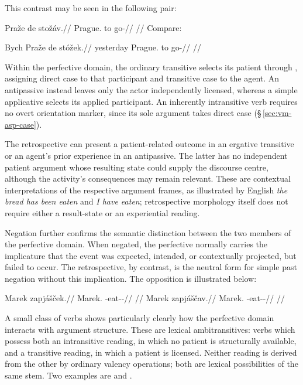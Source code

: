 This contrast may be seen in the following pair:

\pex
\a
\begingl
\gla Praže de stožáv.//
\glb Prague.\Ind{} to go-\Ret{}//
\glft {}//
\endgl
\a Compare:\par
\begingl
\gla Bych Praže de stóžek.//
\glb yesterday Prague.\Ind{} to go-\Pf{}//
\glft {} //
\endgl
\xe

Within the perfective domain, the ordinary transitive selects its patient
through , assigning direct case to that participant and transitive
case to the agent. An antipassive instead leaves only the actor independently
licensed, whereas a simple applicative selects its applied participant. An
inherently intransitive verb requires no overt orientation marker, since its
sole argument takes direct case (§\,\ref{sec:vm-asp-case}).

The retrospective can present a patient-related outcome in an ergative
transitive or an agent's prior experience in an antipassive. The latter has no
independent patient argument whose resulting state could supply the discourse
centre, although the activity's consequences may remain relevant. These are
contextual interpretations of the respective argument frames, as illustrated
by English \textit{the bread has been eaten} and \textit{I have eaten};
retrospective morphology itself does not require either a result-state or an
experiential reading.

Negation further confirms the semantic distinction between the two members of
the perfective domain. When negated, the perfective normally carries the
implicature that the event was expected, intended, or contextually projected,
but failed to occur. The retrospective, by contrast, is the neutral form for
simple past negation without this implication. The opposition is illustrated
below:

\pex
\a
\begingl
\gla Marek zapjášček.//
\glb Marek.\Dir{} \Neg{}-eat-\Antip{}-\Pf{}//
\glft {}//
\endgl
\a
\begingl
\gla Marek zapjáščav.//
\glb Marek.\Dir{} \Neg{}-eat-\Antip{}-\Ret{}//
\glft {}//
\endgl
\xe

\label{sec:ambitransitive}A small class of verbs shows particularly clearly how the perfective domain
interacts with argument structure. These are lexical ambitransitives: verbs
which possess both an intransitive reading, in which no patient is structurally
available, and a transitive reading, in which a patient is licensed. Neither
reading is derived from the other by ordinary valency operations; both are
lexical possibilities of the same stem. Two examples are   and  .

